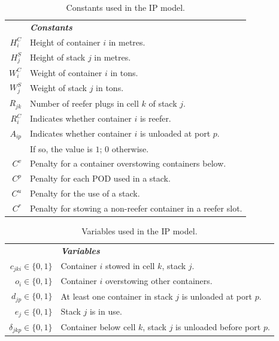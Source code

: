 \documentclass[preprint,12pt,3p]{elsarticle}
\begin{document}
\begin{table}[!ht]
\begin{center}
\begin{tabular}{rl}
    & \textbf{\textit{Constants}}\\
    $H^{C}_{i}$& Height of container $i$ in metres.\\
    $H^{S}_{j}$& Height of stack $j$ in metres.\\
    $W^{C}_{i}$& Weight of container $i$ in tons.\\
    $W^{S}_{j}$& Weight of stack $j$ in tons.\\
    $R_{jk}$& Number of reefer plugs in cell $k$ of stack $j$.\\
    $R^{C}_{i}$& Indicates whether container $i$ is reefer.\\
    $A_{ip}$& Indicates whether container $i$ is unloaded at port $p$.\\
    & If so, the value is $1$; $0$ otherwise.\\
    $C^v$& Penalty for a container overstowing containers below.\\
    $C^p$& Penalty for each POD used in a stack.\\
    $C^u$& Penalty for the use of a stack.\\
    $C^r$& Penalty for stowing a non-reefer container in a reefer slot.
\end{tabular}
\end{center}
\caption{Constants used in the IP model.}
\label{tab:IPConstants}
\end{table}

\begin{table} [!ht]
\begin{center}
\begin{tabular}{rl}
    & \textbf{\textit{Variables}}\\
    $c_{jki} \in \{0, 1\}$& Container $i$ stowed in cell $k$, stack $j$.\\
    $o_{i} \in \{0, 1\}$& Container $i$ overstowing other containers.\\
    $d_{jp} \in \{0, 1\}$& At least one container in stack $j$ is unloaded at port $p$.\\
    $e_{j} \in \{0, 1\}$& Stack $j$ is in use.\\
    $\delta_{jkp} \in \{0, 1\}$& Container below cell $k$, stack $j$ is unloaded before port $p$.
\end{tabular}
\end{center}
\caption{Variables used in the IP model.}
\label{tab:IPVars}
\end{table}
\end{document}
